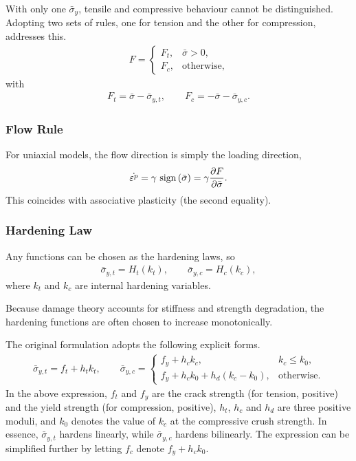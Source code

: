 With only one $\bar{\sigma}_y$, tensile and compressive behaviour cannot be distinguished.
Adopting two sets of rules, one for tension and the other for compression, addresses this.
\begin{gather}
F=\left\{
\begin{array}{ll}
F_t,&\bar{\sigma}>0,\\
F_c,&\text{otherwise},
\end{array}
\right.
\end{gather}
with
\begin{gather}
F_t=\bar{\sigma}-\bar{\sigma}_{y,t},\qquad
F_c=-\bar{\sigma}-\bar{\sigma}_{y,c}.
\end{gather}
\subsubsection{Flow Rule}
For uniaxial models, the flow direction is simply the loading direction,
\begin{gather}
\dot{\varepsilon^p}=\gamma~\text{sign}\left(\bar{\sigma}\right)=\gamma\dfrac{\partial{F}}{\partial{\bar{\sigma}}}.
\end{gather}
This coincides with associative plasticity (the second equality).
\subsubsection{Hardening Law}
Any functions can be chosen as the hardening laws, so
\begin{gather}
\bar{\sigma}_{y,t}=H_t\left(k_t\right),\qquad
\bar{\sigma}_{y,c}=H_c\left(k_c\right),
\end{gather}
where $k_t$ and $k_c$ are internal hardening variables.

Because damage theory accounts for stiffness and strength degradation, the hardening functions are often chosen to increase monotonically.

The original formulation adopts the following explicit forms.
\begin{gather}\label{eq:k4_hardening}
\bar{\sigma}_{y,t}=f_t+h_tk_t,\qquad
\bar{\sigma}_{y,c}=\left\{
\begin{array}{ll}
f_y+h_ck_c,&k_c\leqslant{}k_0,\\
f_y+h_ck_0+h_d\left(k_c-k_0\right),&\text{otherwise}.
\end{array}
\right.
\end{gather}
In the above expression, $f_t$ and $f_y$ are the crack strength (for tension, positive) and the yield strength (for compression, positive), $h_t$, $h_c$ and $h_d$ are three positive moduli, and $k_0$ denotes the value of $k_c$ at the compressive crush strength.
In essence, $\bar{\sigma}_{y,t}$ hardens linearly, while $\bar{\sigma}_{y,c}$ hardens bilinearly.
The expression can be simplified further by letting $f_c$ denote $f_y+h_ck_0$.

